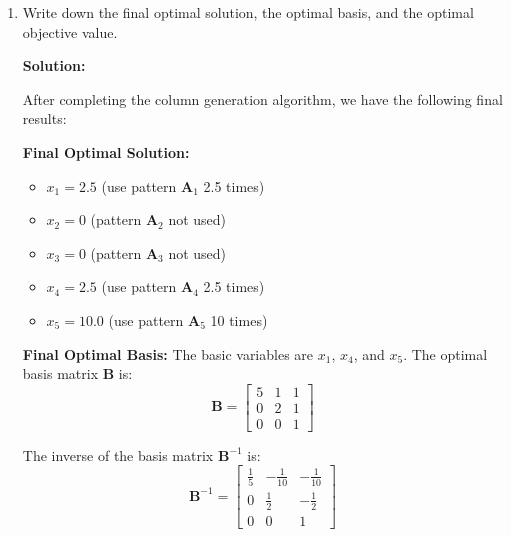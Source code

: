 \documentclass[11pt]{article}
\newcommand{\mb}[1]{\ensuremath{\boldsymbol{#1}}}
\begin{document}
\begin{enumerate}
\begin{enumerate}
Using the updated dual solution, the pricing problem gives:
\begin{itemize}
\item \textbf{New pattern}: $[5, 0, 0]$ (same as $\mb{A}_1$)
\item \textbf{Objective value}: $1.0$
\end{itemize}

\textbf{Should we terminate the column generation algorithm?}

\textbf{Yes, we should terminate the column generation algorithm at this iteration.}

\textbf{Explanation:} The objective function value is $1.0 \leq 1$. This means no new pattern can improve the current solution, so the column generation algorithm terminates.



\item Write down the final optimal solution, the optimal basis, and the optimal objective value.

\textbf{Solution:}

After completing the column generation algorithm, we have the following final results:

\textbf{Final Optimal Solution:}
\begin{itemize}
\item $x_1 = 2.5$ (use pattern $\mb{A}_1$ 2.5 times)
\item $x_2 = 0$ (pattern $\mb{A}_2$ not used)
\item $x_3 = 0$ (pattern $\mb{A}_3$ not used)
\item $x_4 = 2.5$ (use pattern $\mb{A}_4$ 2.5 times)
\item $x_5 = 10.0$ (use pattern $\mb{A}_5$ 10 times)
\end{itemize}

\textbf{Final Optimal Basis:}
The basic variables are $x_1$, $x_4$, and $x_5$. The optimal basis matrix $\mb{B}$ is:
$$\mb{B} = \begin{bmatrix} 5 & 1 & 1 \\ 0 & 2 & 1 \\ 0 & 0 & 1 \end{bmatrix}$$

The inverse of the basis matrix $\mb{B}^{-1}$ is:
$$\mb{B}^{-1} = \begin{bmatrix} \frac{1}{5} & -\frac{1}{10} & -\frac{1}{10} \\ 0 & \frac{1}{2} & -\frac{1}{2} \\ 0 & 0 & 1 \end{bmatrix}$$


\end{enumerate}
\end{enumerate}
\end{document}
